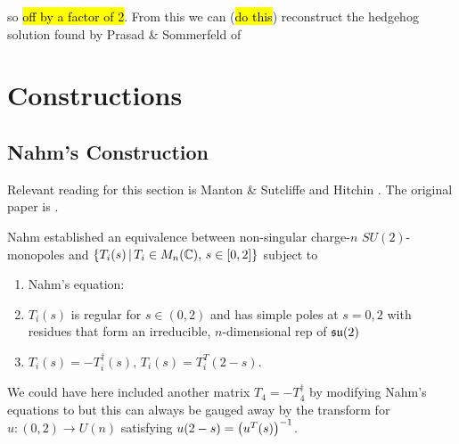 \documentclass{article}
\begin{document}
\begin{example}
so 
\hl{off by a factor of 2}. From this we can (\hl{do this}) reconstruct the hedgehog solution found by Prasad \& Sommerfeld of 
\end{example}


\section{Constructions}
\subsection{Nahm's Construction}
Relevant reading for this section is Manton \& Sutcliffe \cite{Manton2004} and Hitchin \cite{Hitchin1983}. The original paper is \cite{Nahm1983}.

Nahm established an equivalence between non-singular charge-$n$ $SU(2)$-monopoles and $\left\{ T_i(s) \, | \, T_i \in M_n(\mathbb{C}), \, s \in [0,2] \right\}$ subject to 
\begin{enumerate}
	\item Nahm's equation:
	\item $T_i(s)$ is regular for $s \in (0,2)$ and has simple poles at $s=0,2$ with residues that form an irreducible, $n$-dimensional rep of $\mathfrak{su}(2)$
	\item $T_i(s) = -T_i^\dagger(s), \, T_i(s) = T^T_i(2-s)$. 
\end{enumerate}

\begin{remark}
	We could have here included another matrix $T_4 = -T_4^\dagger$ by modifying Nahm's equations to 
	but this can always be gauged away by the transform 
	for $u:(0,2) \to U(n)$ satisfying $u(2-s) = \left( u^T(s) \right)^{-1}$.
\end{remark}
\end{document}
